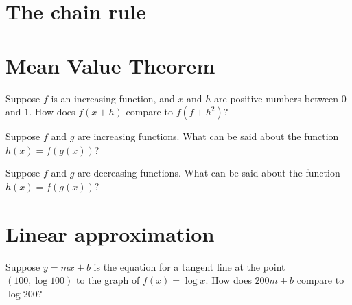 \documentclass{ximera}
\begin{document}
\section{The chain rule}
\section{Mean Value Theorem}

\begin{problem}
  Suppose $f$ is an increasing function, and $x$ and $h$ are positive numbers between $0$ and $1$.  How does $f(x + h)$ compare to $f(f + h^2)$?
  \begin{multipleChoice}
  \end{multipleChoice}
\end{problem}

\begin{problem}
  Suppose $f$ and $g$ are increasing functions.  What can be said about the function $h(x) = f(g(x))$?
  \begin{multipleChoice}
  \end{multipleChoice}
\end{problem}


\begin{problem}
  Suppose $f$ and $g$ are decreasing functions.  What can be said about the function $h(x) = f(g(x))$?
  \begin{multipleChoice}
  \end{multipleChoice}
\end{problem}



\section{Linear approximation}

\begin{problem}
  Suppose $y = mx + b$ is the equation for a tangent line at the point $(100,\log 100)$ to the graph of $f(x) = \log x$.  How does $200m + b$ compare to $\log 200$?
  \begin{multipleChoice}
  \end{multipleChoice}
\end{problem}
\end{document}
